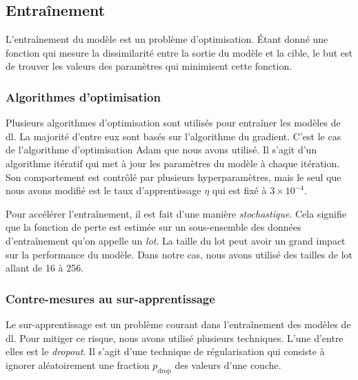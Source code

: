\subsection{Entraînement}

L'entraînement du modèle est un problème d'optimisation.
Étant donné une fonction qui mesure la dissimilarité entre la sortie du modèle et la cible,
le but est de trouver les valeurs des paramètres qui minimisent cette fonction.

\subsubsection{Algorithmes d'optimisation}

Plusieurs algorithmes d'optimisation sont utilisés pour entraîner les modèles de \gls{dl}.
La majorité d'entre eux sont basés sur l'algorithme du gradient.
C'est le cas de l'algorithme d'optimisation Adam \cite{Kingma_Ba_2017} que nous avons utilisé.
Il s'agit d'un algorithme itératif qui met à jour les paramètres du modèle à chaque itération.
Son comportement est contrôlé par plusieurs hyperparamètres,
mais le seul que nous avons modifié est le taux d'apprentissage \(\eta\) qui est fixé à \(3\times10^{-4}\).

Pour accélérer l'entraînement, il est fait d'une manière \emph{stochastique}.
Cela signifie que la fonction de perte est estimée 
sur un sous-ensemble des données d'entraînement qu'on appelle un \emph{lot}.
La taille du lot peut avoir un grand impact sur la performance du modèle.
Dans notre cas, nous avons utilisé des tailles de lot allant de 16 à 256.


\subsubsection{Contre-mesures au sur-apprentissage}

Le sur-apprentissage est un problème courant dans l'entraînement des modèles de \gls{dl}.
Pour mitiger ce risque, nous avons utilisé plusieurs techniques.
L'une d'entre elles est le \emph{\foreignlanguage{english}{dropout}}.
Il s'agit d'une technique de régularisation 
qui consiste à ignorer aléatoirement une fraction \(p_{\mathrm{drop}}\) des valeurs d'une couche.

